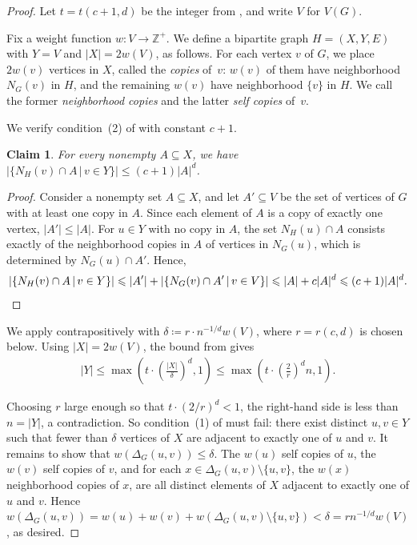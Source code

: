 \documentclass[11pt]{article}
\newtheorem{claim}[theorem]{Claim}
\theoremstyle{definition}
\renewcommand{\leq}{\leqslant}
\newcommand{\set}[1]{\{#1\}}
\newcommand{\setof}[2]{\set{#1 \,|\, #2 }}
\begin{document}
\existFractionalTwins*
\begin{proof}
    Let $t = t(c+1,d)$ be the integer from , and write $V$ for $V(G)$.

    Fix a weight function $w\colon V \rightarrow \mathbb{Z}^+$. We define a bipartite graph $H=(X,Y,E)$ with $Y=V$ and $|X|=2w(V)$, as follows. For each vertex $v$ of $G$, we place $2w(v)$ vertices in $X$, called the \emph{copies} of~$v$: $w(v)$ of them have neighborhood $N_G(v)$ in $H$, and the remaining $w(v)$ have neighborhood $\{v\}$ in $H$. We call the former \emph{neighborhood copies} and the latter \emph{self copies} of~$v$.

    We verify condition~(2) of  with constant $c+1$. 
    
    \begin{claim}
      For every nonempty $A \subseteq X$, we have $|\setof{N_H(v)\cap A}{v\in Y}| \leq (c+1)|A|^d$.
    \end{claim}
    \begin{proof}
    Consider a nonempty set $A \subseteq X$, and let $A' \subseteq V$ be the set of vertices of $G$ with at least one copy in $A$. Since each element of $A$ is a copy of exactly one vertex, $|A'| \leq |A|$. For $u \in Y$ with no copy in $A$, the set $N_H(u) \cap A$ consists exactly of the neighborhood copies in $A$ of vertices in $N_G(u)$, which is determined by $N_G(u) \cap A'$. Hence,
    \[
    |\setof{N_H(v) \cap A}{v \in Y}| \leq |A'| + |\setof{N_G(v) \cap A'}{v \in V}| \leq |A| + c|A|^d \leq (c+1)|A|^d.\qedhere
    \]
    \end{proof}

    We apply  contrapositively with $\delta \coloneqq r \cdot n^{-1/d} w(V)$, where $r = r(c,d)$ is chosen below. 
    Using $|X| = 2w(V)$, the bound from  gives
    \begin{align*}
    |Y| \leq \max\!\left(t\cdot \left(\frac{|X|}{\delta}\right)^{\!d}\!, 1\right) \leq \max\!\left(t\cdot \left(\frac{2}{r}\right)^{\!d} n, 1\right).
    \end{align*}

    Choosing $r$ large enough so that $t \cdot (2/r)^d < 1$, the right-hand side is less than $n = |Y|$, a contradiction. So condition~(1) of  must fail: there exist distinct $u, v \in Y$ such that fewer than $\delta$ vertices of $X$ are adjacent to exactly one of $u$ and $v$.
    It remains to show that $w(\Delta_G(u,v)) \leq \delta$.
    The $w(u)$ self copies of $u$, the $w(v)$ self copies of $v$, and for each $x \in \Delta_G(u,v) \setminus \{u,v\}$, the $w(x)$ neighborhood copies of $x$, are all distinct elements of $X$ adjacent to exactly one of $u$ and $v$. Hence $w(\Delta_G(u,v)) = w(u) + w(v) + w(\Delta_G(u,v) \setminus \{u,v\}) < \delta = rn^{-1/d}w(V)$, as desired.
\end{proof}
\end{document}
